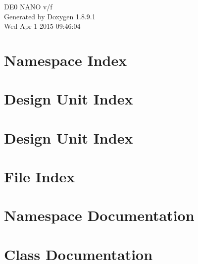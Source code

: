 \documentclass[twoside]{book}
\newcommand{\+}{\discretionary{\mbox{\scriptsize$\hookleftarrow$}}{}{}}
\newcommand{\clearemptydoublepage}{%
  \newpage{\pagestyle{empty}\cleardoublepage}%
}
\begin{document}
\hypersetup{pageanchor=false,
             bookmarks=true,
             bookmarksnumbered=true,
             pdfencoding=unicode
            }
\begin{titlepage}
\vspace*{7cm}
\begin{center}%
{\Large D\+E0 N\+A\+N\+O v/f }\\
\vspace*{1cm}
{\large Generated by Doxygen 1.8.9.1}\\
\vspace*{0.5cm}
{\small Wed Apr 1 2015 09:46:04}\\
\end{center}
\end{titlepage}
\clearemptydoublepage
\tableofcontents
\clearemptydoublepage
{}
\hypersetup{pageanchor=true}

\chapter{Namespace Index}

\chapter{Design Unit Index}

\chapter{Design Unit Index}

\chapter{File Index}

\chapter{Namespace Documentation}



\chapter{Class Documentation}




































\end{document}
